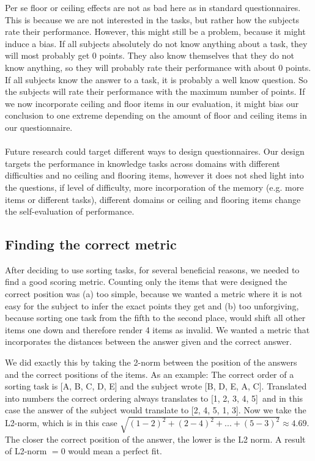 \documentclass[../main/main.tex]{subfiles}
\begin{document}
	Per se floor or ceiling effects are not as bad here as in standard questionnaires. This is because we are not interested in the tasks, but rather how the subjects rate their performance. However, this might still be a problem, because it might induce a bias. If all subjects absolutely do not know anything about a task, they will most probably get 0 points. They also know themselves that they do not know anything, so they will probably rate their performance with about 0 points. If all subjects know the answer to a task, it is probably a well know question. So the subjects will rate their performance with the maximum number of points. If we now incorporate ceiling and floor items in our evaluation, it might bias our conclusion to one extreme depending on the amount of floor and ceiling items in our questionnaire.
	\\\\
	Future research could target different ways to design questionnaires. Our design targets the performance in knowledge tasks across domains with different difficulties and no ceiling and flooring items, however it does not shed light into the questions, if level of difficulty, more incorporation of the memory (e.g. more items or different tasks), different domains or ceiling and flooring items change the self-evaluation of performance.
	
	
	\subsection{Finding the correct metric}
	
	After deciding to use sorting tasks, for several beneficial reasons, we needed to find a good scoring metric. Counting only the items that were designed the correct position was (a) too simple, because we wanted a metric where it is not easy for the subject to infer the exact points they get and (b) too unforgiving, because sorting one task from the fifth to the second place, would shift all other items one down and therefore render 4 items as invalid. We wanted a metric that incorporates the distances between the answer given and the correct answer.
	
	We did exactly this by taking the 2-norm between the position of the answers and the correct positions of the items. As an example: The correct order of a sorting task is [A, B, C, D, E] and the subject wrote [B, D, E, A, C]. Translated into numbers the correct ordering always translates to [1, 2, 3, 4, 5] and in this case the answer of the subject would translate to [2, 4, 5, 1, 3]. Now we take the L2-norm, which is in this case $\sqrt{(1-2)^2 + (2-4)^2 + ...  + (5 - 3)^2} \approx 4.69$. The closer the correct position of the answer, the lower is the L2 norm. A result of L2-norm $= 0$ would mean a perfect fit.
	
\end{document}
